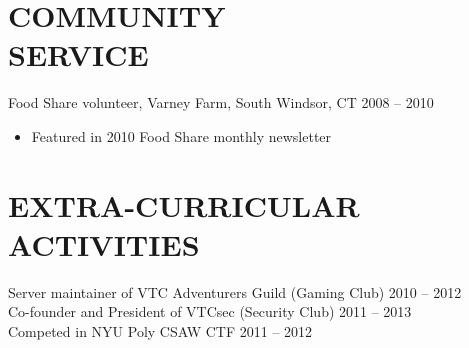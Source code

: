 \documentclass[margin]{res}
\begin{document}
\begin{resume}
\section{COMMUNITY \\ SERVICE} Food Share volunteer, Varney Farm, South 
                Windsor, CT \hfill 2008 -- 2010
                \begin{itemize}
                    \item Featured in 2010 Food Share monthly newsletter
                \end{itemize}

\section{EXTRA-CURRICULAR \\ ACTIVITIES} 
                Server maintainer of VTC Adventurers Guild (Gaming Club)
                    \hfill 2010 -- 2012\\
                Co-founder and President of VTCsec (Security Club) 
                    \hfill 2011 -- 2013\\
                Competed in NYU Poly CSAW CTF \hfill 2011 -- 2012
 

\end{resume}
\end{document}
